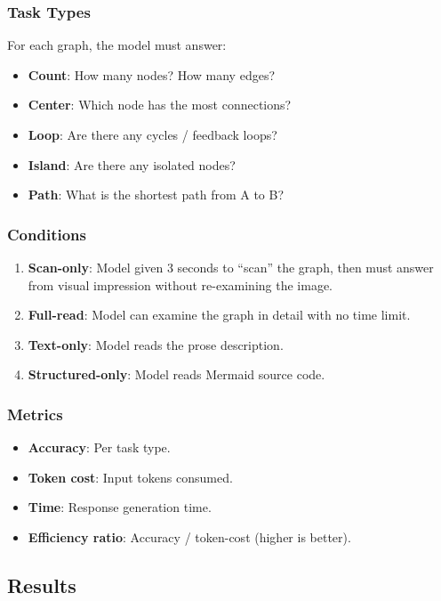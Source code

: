 \documentclass[11pt,a4paper]{article}
\begin{document}
\subsubsection{Task Types}

For each graph, the model must answer:
\begin{itemize}[nosep]
\item \textbf{Count}: How many nodes? How many edges?
\item \textbf{Center}: Which node has the most connections?
\item \textbf{Loop}: Are there any cycles / feedback loops?
\item \textbf{Island}: Are there any isolated nodes?
\item \textbf{Path}: What is the shortest path from A to B?
\end{itemize}

\subsubsection{Conditions}

\begin{enumerate}[nosep]
\item \textbf{Scan-only}: Model given 3 seconds to ``scan'' the graph, then must answer from visual impression without re-examining the image.
\item \textbf{Full-read}: Model can examine the graph in detail with no time limit.
\item \textbf{Text-only}: Model reads the prose description.
\item \textbf{Structured-only}: Model reads Mermaid source code.
\end{enumerate}

\subsubsection{Metrics}

\begin{itemize}[nosep]
\item \textbf{Accuracy}: Per task type.
\item \textbf{Token cost}: Input tokens consumed.
\item \textbf{Time}: Response generation time.
\item \textbf{Efficiency ratio}: Accuracy / token-cost (higher is better).
\end{itemize}

\subsection{Results}
\end{document}
